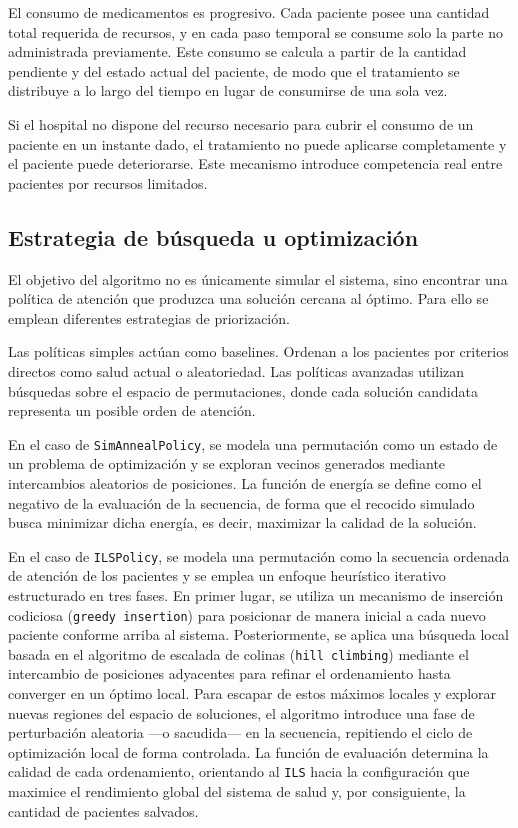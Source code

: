 \documentclass[12pt,a4paper]{article}
\begin{document}
El consumo de medicamentos es progresivo. Cada paciente posee una cantidad total requerida de recursos, 
y en cada paso temporal se consume solo la parte no administrada previamente. 
Este consumo se calcula a partir de la cantidad pendiente y del estado actual del paciente, 
de modo que el tratamiento se distribuye a lo largo del tiempo en lugar de consumirse de una sola vez.

Si el hospital no dispone del recurso necesario para cubrir el consumo de un paciente en un instante dado, 
el tratamiento no puede aplicarse completamente y el paciente puede deteriorarse. 
Este mecanismo introduce competencia real entre pacientes por recursos limitados.

\subsection{Estrategia de búsqueda u optimización}

El objetivo del algoritmo no es únicamente simular el sistema, 
sino encontrar una política de atención que produzca una solución cercana al óptimo. 
Para ello se emplean diferentes estrategias de priorización.

Las políticas simples actúan como baselines. Ordenan a los pacientes por criterios directos como salud actual o aleatoriedad. 
Las políticas avanzadas utilizan búsquedas sobre el espacio de permutaciones, 
donde cada solución candidata representa un posible orden de atención.

En el caso de \texttt{SimAnnealPolicy}, se modela una permutación como un estado de un problema de optimización y 
se exploran vecinos generados mediante intercambios aleatorios de posiciones. 
La función de energía se define como el negativo de la evaluación de la secuencia, 
de forma que el recocido simulado busca minimizar dicha energía, es decir, maximizar la calidad de la solución.

En el caso de \texttt{ILSPolicy}, se modela una permutación como la secuencia ordenada de atención de los pacientes 
y se emplea un enfoque heurístico iterativo estructurado en tres fases. 
En primer lugar, se utiliza un mecanismo de inserción codiciosa (\texttt{greedy insertion}) para posicionar 
de manera inicial a cada nuevo paciente conforme arriba al sistema. Posteriormente, se aplica una búsqueda 
local basada en el algoritmo de escalada de colinas (\texttt{hill climbing}) mediante el intercambio de posiciones 
adyacentes para refinar el ordenamiento hasta converger en un óptimo local. Para escapar de estos máximos locales y 
explorar nuevas regiones del espacio de soluciones, el algoritmo introduce una fase de perturbación aleatoria —o sacudida— 
en la secuencia, repitiendo el ciclo de optimización local de forma controlada. 
La función de evaluación determina la calidad de cada ordenamiento, orientando al \texttt{ILS} hacia la configuración que maximice 
el rendimiento global del sistema de salud y, por consiguiente, la cantidad de pacientes salvados.
\end{document}
